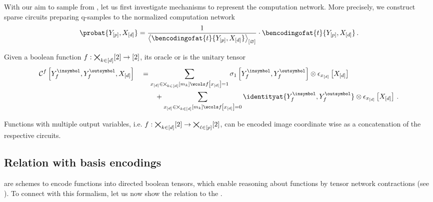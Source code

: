 \section{\ComputationCircuits{}}

With our aim to sample from \CompActNets{}, let us first investigate mechanisms to represent the computation network.
More precisely, we construct sparse circuits preparing q-samples to the normalized computation network
\begin{align*}
    \probat{\headvariables,\shortcatvariables}
    = \frac{1}{\contraction{\bencodingofat{\sstat}{\headvariables,\shortcatvariables}}} \cdot \bencodingofat{\sstat}{\headvariables,\shortcatvariables} \, .
\end{align*}

\begin{definition}[\ComputationCircuit{}]
    Given a boolean function $f:\bigtimes_{k\in[d]}[2]\rightarrow[2]$, its oracle or \computationCircuit{} is the unitary tensor
    \begin{align*}
        \qcbencodingofat{\exformula}{\cheadvariableof{\exformula}{\insymbol},\cheadvariableof{\exformula}{\outsymbol},\shortcatvariables}
        &\quad=
        \sum_{\shortcatindicesin\wcols\exformulaat{\shortcatindices}=1}
        \paulixat{\cheadvariableof{\exformula}{\insymbol},\cheadvariableof{\exformula}{\outsymbol}} \otimes
        \onehotmapofat{\shortcatindices}{\shortcatvariables} \\
        & \quad \quad \quad +
        \sum_{\shortcatindicesin\wcols\exformulaat{\shortcatindices}=0}
        \identityat{\cheadvariableof{\exformula}{\insymbol},\cheadvariableof{\exformula}{\outsymbol}} \otimes
        \onehotmapofat{\shortcatindices}{\shortcatvariables} \, .
    \end{align*}
\end{definition}



Functions with multiple output variables, i.e. $f:\bigtimes_{k\in[d]}[2]\rightarrow\bigtimes_{\ell\in[p]}[2]$, can be encoded image coordinate wise as a concatenation of the respective circuits.

\subsection{Relation with basis encodings}

\BasisEncodings{} are schemes to encode functions into directed boolean tensors, which enable reasoning about functions by tensor network contractions (see \cite{goessmann_tensor_2026}).
To connect with this formalism, let us now show the relation to the \computationCircuits{}.

